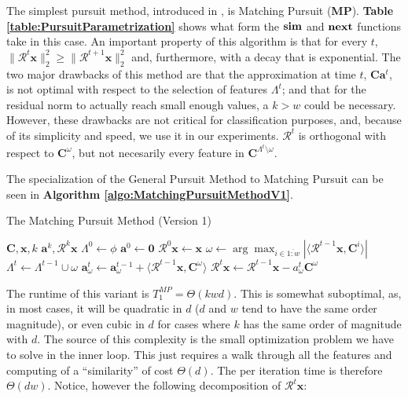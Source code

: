 \documentclass[12pt,a4paper,oneside,english]{UPBThesis}
\newcommand{\hcrange}[2]{\overline{{#1}\colon\!\!{#2}}}
\begin{document}
The simplest pursuit method, introduced in \cite{matchingpursuit1}, is Matching Pursuit (\textbf{MP}). \textbf{Table \ref{table:PursuitParametrization}} shows what form the $\text{\textbf{sim}}$ and $\text{\textbf{next}}$ functions take in this case. An important property of this algorithm is that for every $t$, $\|\mathcal{R}^t\textbf{x}\|_2^2 \geq \|\mathcal{R}^{t+1}\textbf{x}\|_2^2$ and, furthermore, with a decay that is exponential. The two major drawbacks of this method are that the approximation at time $t$, $\textbf{C}\textbf{a}^t$, is not optimal with respect to the selection of features $\Lambda^t$; and that for the residual norm to actually reach small enough values, a $k > w$ could be necessary. However, these drawbacks are not critical for classification purposes, and, because of its simplicity and speed, we use it in our experiments. $\mathcal{R}^t$ is orthogonal with respect to $\textbf{C}^\omega$, but not necesarily every feature in $\textbf{C}^{\Lambda^t \setminus \omega}$.

The specialization of the General Pursuit Method to Matching Pursuit can be seen in \textbf{Algorithm \ref{algo:MatchingPursuitMethodV1}}.

\begin{algorithm}
\caption{The Matching Pursuit Method (Version 1)}
\label{algo:MatchingPursuitMethodV1}
\begin{algorithmic}
\Require $\textbf{C},\textbf{x},k$
\Ensure $\textbf{a}^k,\mathcal{R}^k\textbf{x}$
\State $\Lambda^0 \gets \phi$
\State $\textbf{a}^0 \gets \textbf{0}$
\State $\mathcal{R}^0\textbf{x} \gets \textbf{x}$
\For {$t = \hcrange{1}{k}$}
\State $\omega \gets \arg \max_{i \in \hcrange{1}{w}} \left| \langle \mathcal{R}^{t-1}\textbf{x}, \textbf{C}^i \rangle \right|$
\State $\Lambda^t \gets \Lambda^{t-1} \cup \omega$
\State $\textbf{a}_\omega^t \gets \textbf{a}_\omega^{t-1} + \langle \mathcal{R}^{t-1}\textbf{x} , \textbf{C}^\omega \rangle$
\State $\mathcal{R}^t\textbf{x} \gets \mathcal{R}^{t-1}\textbf{x} - a_\omega^t\textbf{C}^\omega$
\EndFor
\end{algorithmic}
\end{algorithm}

The runtime of this variant is $T_1^{MP} = \Theta(kwd)$. This is somewhat suboptimal, as, in most cases, it will be quadratic in $d$ ($d$ and $w$ tend to have the same order magnitude), or even cubic in $d$ for cases where $k$ has the same order of magnitude with $d$. The source of this complexity is the small optimization problem we have to solve in the inner loop. This just requires a walk through all the features and computing of a ``similarity'' of cost $\Theta(d)$. The per iteration time is therefore $\Theta(dw)$. Notice, however the following decomposition of $\mathcal{R}^t\textbf{x}$:
\end{document}

